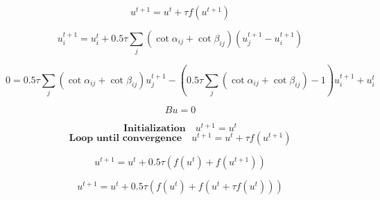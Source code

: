 \documentclass[11pt]{article}
\begin{document}
%
%
%
%
%
%
%


\[ u^{t+1} = u^t + \tau f(u^{t+1}) \]

\[  u_i^{t+1} = u_i^t + 0.5 \tau \sum_j (\cot\alpha_{ij} + \cot\beta_{ij})(u_j^{t+1} - u_i^{t+1}) \]


\[ 0 = 0.5 \tau \sum_j (\cot\alpha_{ij} + \cot\beta_{ij}) u_j^{t+1} -
    (0.5 \tau\sum_j (\cot\alpha_{ij} + \cot\beta_{ij}) - 1) u_i^{t+1} +
    u_i^t  \]
    
    
    \[ Bu = 0 \]
    
\[ \textbf{Initialization} \quad u^{t+1} = u^t  \]        
\[ \textbf{Loop until convergence}  \quad  u^{t+1}= u^t + \tau f(u^{t+1})\]



\[ u^{t+1}= u^t + 0.5\tau (f(u^t) + f(u^{t+1})) \]

\[u^{t+1}= u^t + 0.5\tau (f(u^t) + f(u^t + \tau f(u^t))) \]
\end{document}
